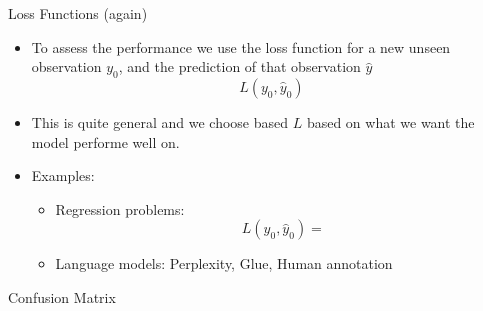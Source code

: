 \documentclass[10pt,handout]{beamer}
\newcommand\MyBox[2]{
  \fbox{\lower0.75cm
    \vbox to 1.7cm{\vfil
      \hbox to 1.7cm{\hfil\parbox{1.4cm}{#1\\#2}\hfil}
      \vfil}%
  }%
}
\begin{document}
\begin{frame}{Loss Functions (again)}



\begin{itemize}

\item To assess the performance we use the loss function for a new unseen observation $y_0$, and the prediction of that observation $\hat{y}$
\[
L(y_0,\hat{y}_0)
\]\pause
\item This is quite general and we choose based $L$ based on what we want the model performe well on.\pause
\item Examples:
\begin{itemize}
\item Regression problems:
\[
    L(y_0,\hat{y}_0) =
\]

\pause
\item Language models: Perplexity, Glue, Human annotation
\end{itemize}


\end{itemize}

\end{frame}


\begin{frame}{Confusion Matrix}



\end{frame}
\end{document}

